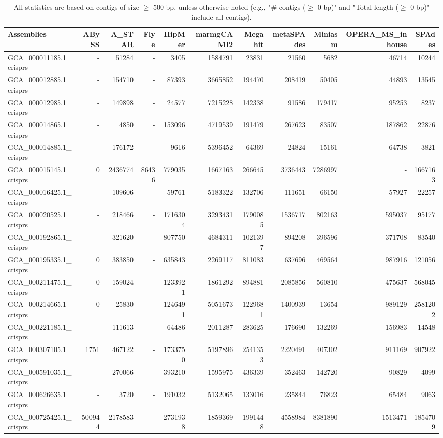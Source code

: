 \documentclass[12pt,a4paper]{article}
\begin{document}
\begin{table}[ht]
\begin{center}
\caption{All statistics are based on contigs of size $\geq$ 500 bp, unless otherwise noted (e.g., "\# contigs ($\geq$ 0 bp)" and "Total length ($\geq$ 0 bp)" include all contigs).}
\begin{tabular}{|l*{10}{|r}|}
\hline
Assemblies & ABySS & A\_STAR & Flye & HipMer & marmgCAMI2 & Megahit & metaSPAdes & Miniasm & OPERA\_MS\_inhouse & SPAdes \\ \hline
GCA\_000011185.1\_crisprs & - & 51284 & - & 3405 & 1584791 & 23831 & 21560 & 5682 & 46714 & 10244 \\ \hline
GCA\_000012885.1\_crisprs & - & 154710 & - & 87393 & 3665852 & 194470 & 208419 & 50405 & 44893 & 13545 \\ \hline
GCA\_000012985.1\_crisprs & - & 149898 & - & 24577 & 7215228 & 142338 & 91586 & 179417 & 95253 & 8237 \\ \hline
GCA\_000014865.1\_crisprs & - & 4850 & - & 153096 & 4719539 & 191479 & 267623 & 83507 & 187862 & 22876 \\ \hline
GCA\_000014885.1\_crisprs & - & 176172 & - & 9616 & 5396452 & 64369 & 24824 & 15161 & 64738 & 3821 \\ \hline
GCA\_000015145.1\_crisprs & 0 & 2436774 & 86436 & 779035 & 1667163 & 266645 & 3736443 & 7286997 & - & 1667163 \\ \hline
GCA\_000016425.1\_crisprs & - & 109606 & - & 59761 & 5183322 & 132706 & 111651 & 66150 & 57927 & 22257 \\ \hline
GCA\_000020525.1\_crisprs & - & 218466 & - & 1716304 & 3293431 & 1790085 & 1536717 & 802163 & 595037 & 95177 \\ \hline
GCA\_000192865.1\_crisprs & - & 321620 & - & 807750 & 4684311 & 1021397 & 894208 & 396596 & 371708 & 83540 \\ \hline
GCA\_000195335.1\_crisprs & 0 & 383850 & - & 635843 & 2269117 & 811083 & 637696 & 469564 & 987916 & 121056 \\ \hline
GCA\_000211475.1\_crisprs & 0 & 159024 & - & 1233921 & 1861292 & 894881 & 2085856 & 560810 & 475637 & 568045 \\ \hline
GCA\_000214665.1\_crisprs & 0 & 25830 & - & 1246491 & 5051673 & 1229681 & 1400939 & 13654 & 989129 & 2581202 \\ \hline
GCA\_000221185.1\_crisprs & - & 111613 & - & 64486 & 2011287 & 283625 & 176690 & 132269 & 156983 & 14548 \\ \hline
GCA\_000307105.1\_crisprs & 1751 & 467122 & - & 1733750 & 5197896 & 2541353 & 2220491 & 407302 & 911169 & 907922 \\ \hline
GCA\_000591035.1\_crisprs & - & 270066 & - & 393210 & 1595975 & 436339 & 352463 & 142720 & 90829 & 4099 \\ \hline
GCA\_000626635.1\_crisprs & - & 3720 & - & 191032 & 5132065 & 133016 & 235844 & 76823 & 65484 & 9063 \\ \hline
GCA\_000725425.1\_crisprs & 500944 & 2178583 & - & 2731938 & 1859369 & 1991448 & 4558984 & 8381890 & 1513471 & 1854709 \\ \hline
\end{tabular}
\end{center}
\end{table}
\end{document}
